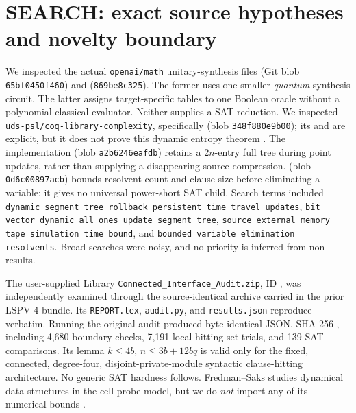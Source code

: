 \documentclass[11pt]{article}
\begin{document}
\section{SEARCH: exact source hypotheses and novelty boundary}
We inspected the actual \texttt{openai/math} unitary-synthesis files  (Git blob \texttt{65bf0450f460}) and  (\texttt{869be8c325}). The former uses one smaller \emph{quantum} synthesis circuit. The latter assigns target-specific tables to one Boolean oracle without a polynomial classical evaluator. Neither supplies a SAT reduction. We inspected \texttt{uds-psl/coq-library-complexity}, specifically  (blob \texttt{348f880e9b00}); its  and  are explicit, but it does not prove this dynamic entropy theorem \cite{gaeher}. The  implementation (blob \texttt{a2b6246eafdb}) retains a $2n$-entry full tree during point updates, rather than supplying a disappearing-source compression.  (blob \texttt{0d6c00897acb}) bounds resolvent count and clause size before eliminating a variable; it gives no universal power-short SAT child. Search terms included \texttt{dynamic segment tree rollback persistent time travel updates}, \texttt{bit vector dynamic all ones update segment tree}, \texttt{source external memory tape simulation time bound}, and \texttt{bounded variable elimination resolvents}. Broad searches were noisy, and no priority is inferred from non-results.

The user-supplied Library \texttt{Connected\_Interface\_Audit.zip}, ID , was independently examined through the source-identical archive carried in the prior LSPV-4 bundle. Its \texttt{REPORT.tex}, \texttt{audit.py}, and \texttt{results.json} reproduce verbatim. Running the original audit produced byte-identical JSON, SHA-256 , including 4,680 boundary checks, 7,191 local hitting-set trials, and 139 SAT comparisons. Its lemma $k\le4b$, $n\le3b+12bq$ is valid only for the fixed, connected, degree-four, disjoint-private-module syntactic clause-hitting architecture. No generic SAT hardness follows. Fredman--Saks studies dynamical data structures in the cell-probe model, but we do \emph{not} import any of its numerical bounds \cite{fredmansaks}.
\end{document}

